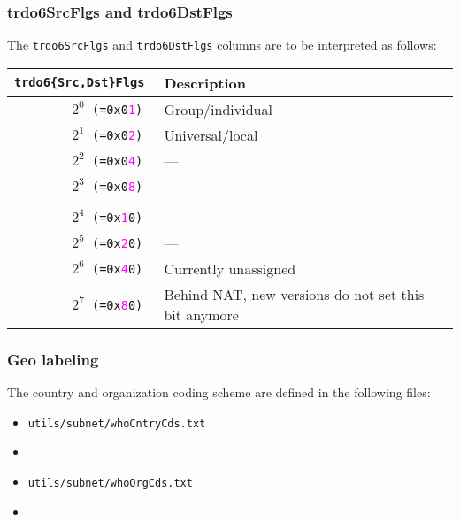 \documentclass[documentation]{subfiles}
\begin{document}
\subsubsection{trdo6SrcFlgs and trdo6DstFlgs}\label{trdoFlags}
The {\tt trdo6SrcFlgs} and {\tt trdo6DstFlgs} columns are to be interpreted as follows:
\begin{longtable}{>{\tt}rl}
    \toprule
    {\bf trdo6\{Src,Dst\}Flgs}           & {\bf Description}\\
    \midrule\endhead%
    $2^{0}$ (=0x0\textcolor{magenta}{1}) & Group/individual\\
    $2^{1}$ (=0x0\textcolor{magenta}{2}) & Universal/local\\
    $2^{2}$ (=0x0\textcolor{magenta}{4}) & ---\\
    $2^{3}$ (=0x0\textcolor{magenta}{8}) & ---\\
    \\
    $2^{4}$ (=0x\textcolor{magenta}{1}0) & ---\\
    $2^{5}$ (=0x\textcolor{magenta}{2}0) & ---\\
    $2^{6}$ (=0x\textcolor{magenta}{4}0) & Currently unassigned\\
    $2^{7}$ (=0x\textcolor{magenta}{8}0) & Behind NAT, new versions do not set this bit anymore\\
    \bottomrule
\end{longtable}

\subsubsection{Geo labeling}\label{subnet}

The country and organization coding scheme are defined in the following files:\\

\begin{minipage}{.48\textwidth}
    \begin{itemize}
        \item {\tt utils/subnet/whoCntryCds.txt}
        \item[]
    \end{itemize}
\end{minipage}
\hfill
\begin{minipage}{.48\textwidth}
    \begin{itemize}
        \item {\tt utils/subnet/whoOrgCds.txt}
        \item[]
    \end{itemize}
\end{minipage}
\end{document}
